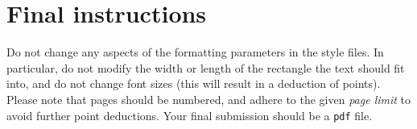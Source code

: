 \documentclass{article}
\begin{document}
\section{Final instructions}

Do not change any aspects of the formatting parameters in the style files. In
particular, do not modify the width or length of the rectangle the text should
fit into, and do not change font sizes (this will result in a deduction of points). 
Please note that pages should be numbered, and adhere to the given \emph{page limit} to avoid further point deductions. Your final submission should be a \texttt{pdf} file.

\end{document}
